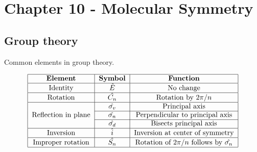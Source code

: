 \documentclass[letterpaper]{article}
\begin{document}
\newpage
\section*{Chapter 10 - Molecular Symmetry}
\subsection*{Group theory}
Common elements in group theory.
\begin{table}[!htb]
    \begin{align*}
        \begin{tabular}{|c|c|c|}
            \hline
            \textbf{Element}                     & \textbf{Symbol}  & \textbf{Function}                                \\
            \hline
            Identity                             & $\hat{E}$        & No change                                        \\
            \hline
            Rotation                             & $\hat{C_n}$      & Rotation by $2\pi / n$                           \\
            \hline
            \multirow{3}{*}{Reflection in plane} & $\hat{\sigma_v}$ & Principal axis                                   \\
            \cline{2-3}
                                                 & $\hat{\sigma_n}$ & Perpendicular to principal axis                  \\
            \cline{2-3}
                                                 & $\hat{\sigma_d}$ & Bisects principal axis                           \\
            \hline
            Inversion                            & $\hat{i}$        & Inversion at center of symmetry                  \\
            \hline
            Improper rotation                    & $\hat{S_n}$      & Rotation of $2\pi/n$ follows by $\hat{\sigma_n}$ \\
            \hline
        \end{tabular}
    \end{align*}
\end{table}
\end{document}
